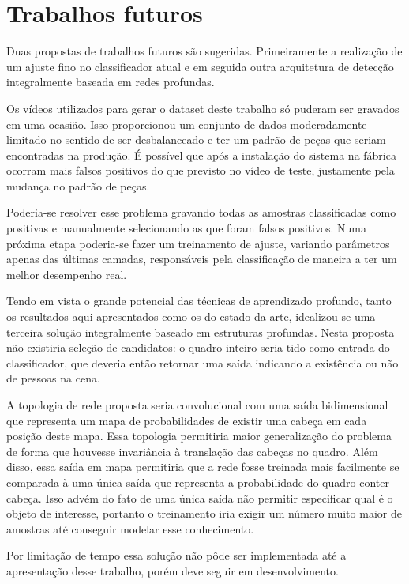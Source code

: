 \section*{Trabalhos futuros}

Duas propostas de trabalhos futuros são sugeridas. Primeiramente a realização de um ajuste fino no classificador atual e em seguida outra arquitetura de detecção integralmente baseada em redes profundas.

Os vídeos utilizados para gerar o dataset deste trabalho só puderam ser gravados em uma ocasião. Isso proporcionou um conjunto de dados moderadamente limitado no sentido de ser desbalanceado e ter um padrão de peças que seriam encontradas na produção. É possível que após a instalação do sistema na fábrica ocorram mais falsos positivos do que previsto no vídeo de teste, justamente pela mudança no padrão de peças.

Poderia-se resolver esse problema gravando todas as amostras classificadas como positivas e manualmente selecionando as que foram falsos positivos. Numa próxima etapa poderia-se fazer um treinamento de ajuste, variando parâmetros apenas das últimas camadas, responsáveis pela classificação de maneira a ter um melhor desempenho real.

Tendo em vista o grande potencial das técnicas de aprendizado profundo, tanto os resultados aqui apresentados como os do estado da arte, idealizou-se uma terceira solução integralmente baseado em estruturas profundas. Nesta proposta não existiria seleção de candidatos: o quadro inteiro seria tido como entrada do classificador, que deveria então retornar uma saída indicando a existência ou não de pessoas na cena.

A topologia de rede proposta seria convolucional com uma saída bidimensional que representa um mapa de probabilidades de existir uma cabeça em cada posição deste mapa. Essa topologia permitiria maior generalização do problema de forma que houvesse invariância à translação das cabeças no quadro. Além disso, essa saída em mapa permitiria que a rede fosse treinada mais facilmente se comparada à uma única saída que representa a probabilidade do quadro conter cabeça. Isso advém do fato de uma única saída não permitir especificar qual é o objeto de interesse, portanto o treinamento iria exigir um número muito maior de amostras até conseguir modelar esse conhecimento.

Por limitação de tempo essa solução não pôde ser implementada até a apresentação desse trabalho, porém deve seguir em desenvolvimento.
